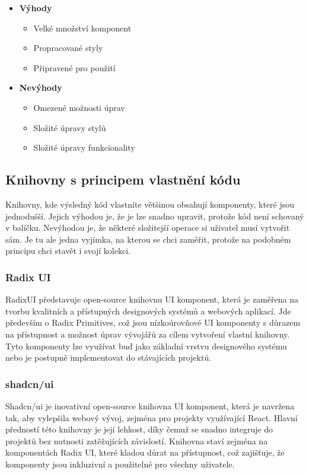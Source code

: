 \begin{itemize}
    \item \textbf{Výhody}
    \begin{itemize}
        \item Velké množství komponent
        \item Propracované styly
        \item Připravené pro použití
    \end{itemize}
    \item \textbf{Nevýhody}
    \begin{itemize}
        \item Omezené možnosti úprav
        \item Složité úpravy stylů

        \item Složité úpravy funkcionality
    \end{itemize}
\end{itemize}

\subsection{Knihovny s principem vlastnění kódu}
Knihovny, kde výsledný kód vlastníte většinou obsahují komponenty, které jsou jednodušší. Jejich výhodou je, že je lze snadno upravit, protože
kód není schovaný v balíčku. Nevýhodou je, že některé složitejší operace si uživatel musí vytvořit sám. Je tu ale jedna vyjímka, na kterou se chci
zaměřit, protože na podobném principu chci stavět i svojí kolekci.

\subsubsection{Radix UI}
RadixUI představuje open-source knihovnu UI komponent, která je zaměřena na tvorbu kvalitních a přístupných designových systémů a webových aplikací.
Jde především o Radix Primitives, což jsou nízkoúrovňové UI komponenty s důrazem na přístupnost a možnost úprav vývojářů za cílem vytvoření vlastní knihovny.
Tyto komponenty lze využívat buď jako základní vrstvu designového systému nebo je postupně implementovat do stávajících projektů. \cite{RadixUIPrimitives}

\subsubsection{shadcn/ui}
Shadcn/ui je inovativní open-source knihovna UI komponent, která je navržena tak, aby vylepšila webový vývoj, zejména pro projekty využívající React.
Hlavní předností této knihovny je její lehkost, díky čemuž se snadno integruje do projektů bez nutnosti zatěžujících závislostí. Knihovna staví
zejména na komponentách Radix UI, které kladou důrat na přístupnost, což zajišťuje, že komponenty jsou inkluzivní a použitelné pro všechny uživatele. \cite{ShadcnUI}

